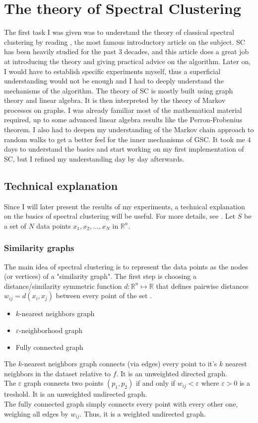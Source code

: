 \documentclass[a4paper,12pt]{article}
\theoremstyle{definition}
\theoremstyle{plain}
\def\R{\mathbb{R}}%
\begin{document}
\section{The theory of Spectral Clustering}
The first task I was given was to understand the theory of classical spectral clustering by reading \cite[A tutorial on Spectral Clustering]{tutorial}, the most famous introductory article on the subject. SC has been heavily studied for the past $3$ decades, and this article does a great job at introducing the theory and giving practical advice on the algorithm. Later on, I would have to establish specific experiments myself, thus a superficial understanding would not be enough and I had to deeply understand the mechanisms of the algorithm. The theory of SC is mostly built using graph theory and linear algebra. It is then interpreted by the theory of Markov processes on graphs. I was already familiar most of the mathematical material required, up to some advanced linear algebra results like the Perron-Frobenius theorem. I also had to deepen my understanding of the Markov chain approach to random walks to get a better feel for the inner mechanisms of GSC.
It took me $4$ days to understand the basics and start working on my first implementation of SC, but I refined my understanding day by day afterwards.
\subsection{Technical explanation}
Since I will later present the results of my experiments, a technical explanation on the basics of spectral clustering will be useful. For more details, see \cite{tutorial}.
Let $S$ be a set of $N$ data points $x_1,x_2, \ldots ,x_N$ in $\R^n$.
\subsubsection{Similarity graphs}
The main idea of spectral clustering is to represent the data points as the nodes (or vertices) of a "similarity graph". The first step is choosing a distance/similarity symmetric function $d: \R^n \mapsto \R$ that defines pairwise distances $w_{ij} = d(x_i,x_j)$ between every point of the set .

\begin{itemize}
	\item $k$-nearest neighbors graph
	\item $\varepsilon$-neighborhood graph
	\item Fully connected graph
\end{itemize}
The $k$-nearest neighbors graph connects (via edges) every point to it's $k$ nearest neighbors in the dataset relative to $f$. It is an unweighted directed graph. \\
The $\varepsilon$ graph connects two points $(p_1,p_2)$ if and only if $w_{ij} < \varepsilon$ where $\varepsilon > 0$  is a treshold. It is an unweighted undirected graph. \\
The fully connected graph simply connects every point with every other one, weighing all edges by $w_{ij}$. Thus, it is a weighted undirected graph. \\
\end{document}
